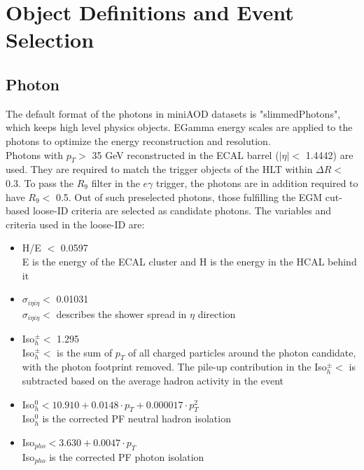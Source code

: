 \documentclass[thesis.tex]{subfiles}
\renewcommand\_{\textunderscore\allowbreak}
\begin{document}
\chapter{Object Definitions and Event Selection}
\label{sec:eventSelection}

\section{Photon}
\label{subsec:photonID}
The default format of the photons in miniAOD datasets is "slimmedPhotons", which keeps high level physics objects. EGamma energy scales are applied to the photons to optimize the energy reconstruction and resolution. \\ 

Photons with $p_{T} >$ 35 GeV reconstructed in the ECAL barrel ($|\eta| <$ 1.4442) are used. They are required to match the trigger objects of the HLT within $\Delta R <$ 0.3. To pass the $R_9$ filter in the $e\gamma$ trigger, the photons are in addition required to have $R_9 <$ 0.5. Out of such preselected photons, those fulfilling the EGM cut-based loose-ID criteria are selected as candidate photons. The variables and criteria used in the loose-ID are:

\begin{center}
\begin{itemize}
\item H/E $<$ 0.0597 \\
        E is the energy of the ECAL cluster and H is the energy in the HCAL behind it
\item $\sigma_{i\eta i\eta} <$ 0.01031  \\
	$\sigma_{i\eta i\eta} <$ describes the shower spread in $\eta$ direction
\item Iso$_h^\pm <$ 1.295 \\
	 Iso$_h^\pm <$ is the sum of $p_{T}$ of all charged particles around the photon candidate, with the photon footprint removed. The pile-up contribution in the Iso$_h^\pm <$ is subtracted based on the average hadron activity in the event 
\item Iso$_h^0 < 10.910 +0.0148 \cdot p_{T} + 0.000017 \cdot p^2_{T}$ \\
	Iso$_h^0$ is the corrected PF neutral hadron isolation
\item Iso$_{pho} < 3.630+0.0047 \cdot p_{T}$ \\
	Iso$_{pho}$ is the corrected PF photon isolation
\end{itemize}
\end{center}
\end{document}
